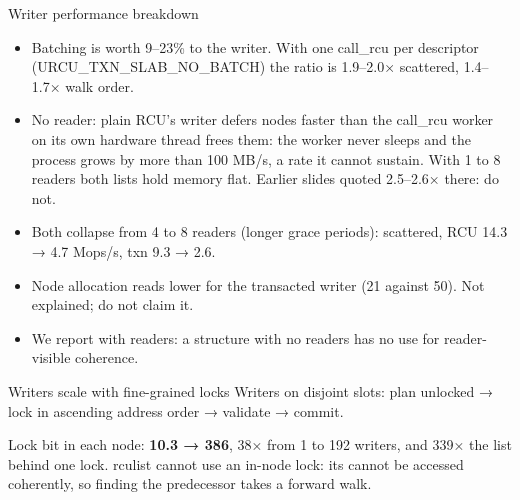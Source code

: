 \documentclass[aspectratio=169, 10pt, t, xcolor=table]{beamer}
\begin{document}
\begin{frame}{Writer performance breakdown}
{\begin{itemize}
      1.3× walk order up to 4 readers, same from 8 up. Not profiled. Kernel
      (not P1's, not measured): the allocator and kfree\_rcu(), no slab.
\item Batching is worth 9--23\% to the writer. With one call\_rcu per
      descriptor (URCU\_TXN\_SLAB\_NO\_BATCH) the ratio is 1.9--2.0×
      scattered, 1.4--1.7× walk order.
\item No reader: plain RCU's writer defers nodes faster than the call\_rcu
      worker on its own hardware thread frees them: the worker never sleeps
      and the process grows by more than 100 MB/s, a rate it cannot sustain.
      With 1 to 8 readers both lists hold memory flat. Earlier slides quoted
      2.5--2.6× there: do not.
\item Both collapse from 4 to 8 readers (longer grace periods): scattered,
      RCU 14.3 → 4.7 Mops/s, txn 9.3 → 2.6.
\item Node allocation reads lower for the transacted writer (21 against 50).
      Not explained; do not claim it.
\item We report with readers: a structure with no readers has no use for
      reader-visible coherence.
\end{itemize}}
\end{frame}

\begin{frame}{Writers scale with fine-grained locks}
\begingroup\small Writers on disjoint slots: plan unlocked → lock in ascending address
order → validate → commit.\par
\endgroup
\vspace{1mm}

\vspace{1mm}
{\small Lock bit in each node: \textbf{10.3 → 386}, 38× from 1 to 192 writers,
and 339× the list behind one lock. rculist cannot use an in-node lock: its
 cannot be accessed coherently, so finding the predecessor takes a
forward walk.\par}
\label{fr:writerscale}
\end{frame}
\end{document}
